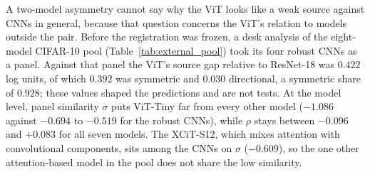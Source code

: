A two-model asymmetry cannot say why the ViT looks like a weak source against CNNs in general, because that question concerns the ViT's relation to models outside the pair. Before the registration was frozen, a desk analysis of the eight-model CIFAR-10 pool (Table~\ref{tab:external_pool}) took its four robust CNNs as a panel. Against that panel the ViT's source gap relative to ResNet-18 was $0.422$ log units, of which $0.392$ was symmetric and $0.030$ directional, a symmetric share of $0.928$; these values shaped the predictions and are not tests. At the model level, panel similarity $\sigma$ puts ViT-Tiny far from every other model ($-1.086$ against $-0.694$ to $-0.519$ for the robust CNNs), while $\rho$ stays between $-0.096$ and $+0.083$ for all seven models. The XCiT-S12, which mixes attention with convolutional components, sits among the CNNs on $\sigma$ ($-0.609$), so the one other attention-based model in the pool does not share the low similarity.

